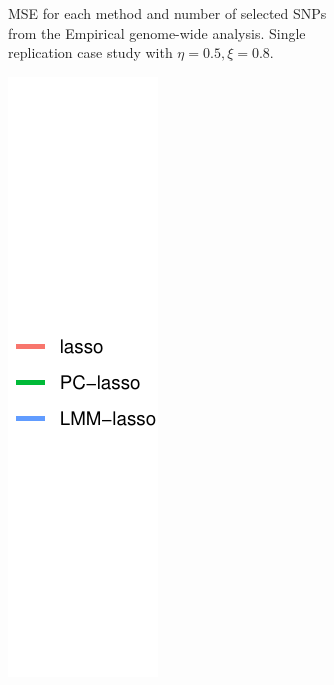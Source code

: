\begin{figure}[H]
\begin{subfigure}[b]{0.4\textwidth}
         \caption{MSE for each method and number of selected SNPs from the Empirical genome-wide analysis. Single replication case study with $\eta = 0.5, \xi = 0.8$.}
        \label{fig:gw_mse}
     \end{subfigure}
     \begin{subfigure}[b]{0.15\textwidth}
         \centering
         \includegraphics[width=\textwidth]{figures/figure_05c.pdf}
     \end{subfigure}
\end{figure}

